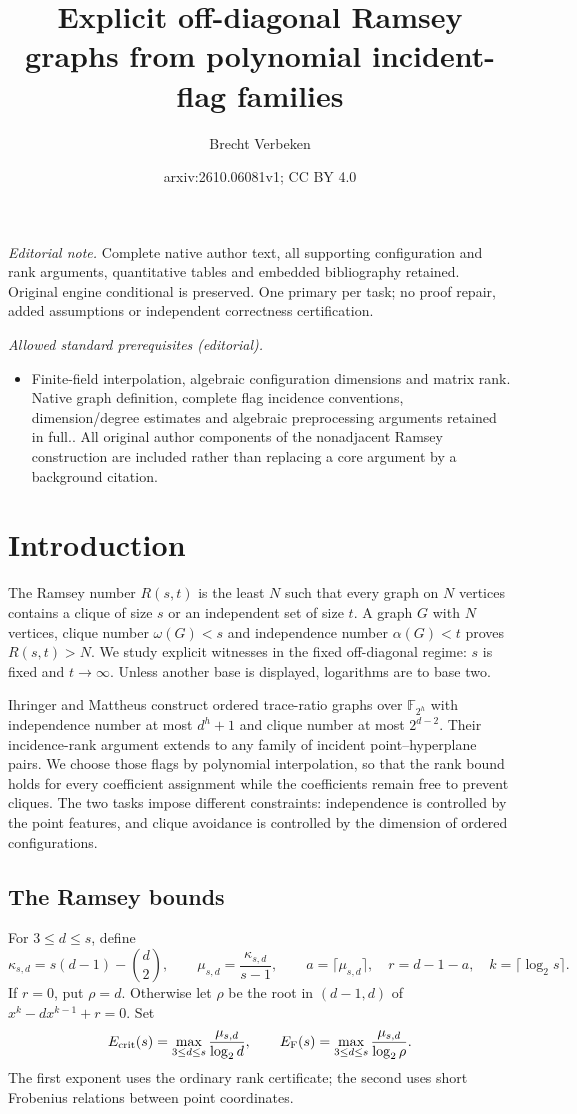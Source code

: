\documentclass[11pt,a4paper]{article}
\title{Explicit off-diagonal Ramsey graphs from polynomial incident-flag families}
\author{Brecht Verbeken}
\date{arxiv:2610.06081v1; CC BY 4.0}
\newcommand{\F}{\mathbb F}
\theoremstyle{definition}
\theoremstyle{remark}
\numberwithin{equation}{section}
\begin{document}
\maketitle
\noindent\textit{Editorial note.} Complete native author text, all supporting configuration and rank arguments, quantitative tables and embedded bibliography retained. Original engine conditional is preserved. One primary per task; no proof repair, added assumptions or independent correctness certification.\par\medskip
\noindent\textit{Allowed standard prerequisites (editorial).}\begin{itemize}
\item Finite-field interpolation, algebraic configuration dimensions and matrix rank. Native graph definition, complete flag incidence conventions, dimension/degree estimates and algebraic preprocessing arguments retained in full.. All original author components of the nonadjacent Ramsey construction are included rather than replacing a core argument by a background citation.
\end{itemize}\medskip
\section{Introduction}\label{sec:intro}
The Ramsey number $R(s,t)$ is the least $N$ such that every graph on $N$ vertices contains a clique of size $s$ or an independent set of size $t$. A graph $G$ with $N$ vertices, clique number $\omega(G)<s$ and independence number $\alpha(G)<t$ proves $R(s,t)>N$. We study explicit witnesses in the fixed off-diagonal regime: $s$ is fixed and $t\to\infty$. Unless another base is displayed, logarithms are to base two.

Ihringer and Mattheus \cite{IM} construct ordered trace-ratio graphs over $\F_{2^h}$ with independence number at most $d^h+1$ and clique number at most $2^{d-2}$. Their incidence-rank argument extends to any family of incident point--hyperplane pairs. We choose those flags by polynomial interpolation, so that the rank bound holds for every coefficient assignment while the coefficients remain free to prevent cliques. The two tasks impose different constraints: independence is controlled by the point features, and clique avoidance is controlled by the dimension of ordered configurations.

\subsection{The Ramsey bounds}
For $3\le d\le s$, define
\[
\kappa_{s,d}=s(d-1)-\binom d2,\qquad
\mu_{s,d}=\frac{\kappa_{s,d}}{s-1},\qquad
a=\lceil\mu_{s,d}\rceil,\quad r=d-1-a,\quad k=\lceil\log_2s\rceil.
\]
If $r=0$, put $\rho=d$. Otherwise let $\rho$ be the root in $(d-1,d)$ of $x^k-dx^{k-1}+r=0$. Set
\[
E_{\rm crit}(s)=\max_{3\le d\le s}\frac{\mu_{s,d}}{\log_2d},\qquad
E_{\rm F}(s)=\max_{3\le d\le s}\frac{\mu_{s,d}}{\log_2\rho}.
\]
The first exponent uses the ordinary rank certificate; the second uses short Frobenius relations between point coordinates.
\end{document}
